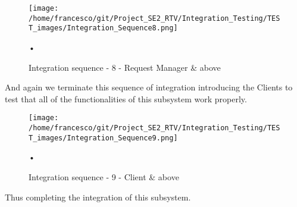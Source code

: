 \documentclass[10pt, a4paper,titlepage]{article}
\begin{document}
\begin{figure}[h]
\begin{center}
\texttt{[image: /home/francesco/git/Project\_SE2\_RTV/Integration\_Testing/TEST\_images/Integration\_Sequence8.png]}
\caption{Integration sequence - 8 - Request Manager \& above}
\label{fig:int_seq8}
\end{center}•
\end{figure}
And again we terminate this sequence of integration introducing the Clients to test that all of the functionalities of this subsystem work properly.
\begin{figure}[h]
\begin{center}
\texttt{[image: /home/francesco/git/Project\_SE2\_RTV/Integration\_Testing/TEST\_images/Integration\_Sequence9.png]}
\caption{Integration sequence - 9 - Client \& above}
\label{fig:int_seq9}
\end{center}•
\end{figure}
Thus completing the integration of this subsystem.
\clearpage
\end{document}
